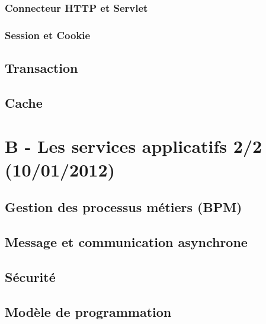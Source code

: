\subsubsection{Connecteur HTTP et Servlet}
\subsubsection{Session et Cookie}

\subsection{Transaction}

\subsection{Cache}

\section{B - Les services applicatifs 2/2 (10/01/2012)}
\subsection{Gestion des processus métiers (BPM)}

\subsection{Message et communication asynchrone}

\subsection{Sécurité}
\subsection{Modèle de programmation}

